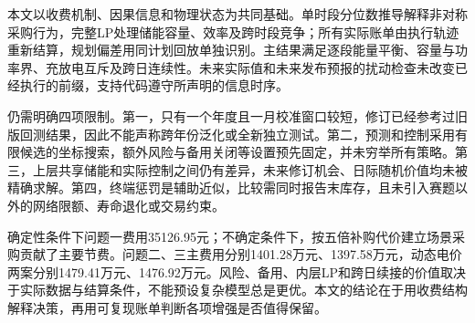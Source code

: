 本文以收费机制、因果信息和物理状态为共同基础。单时段分位数推导解释非对称采购行为，完整LP处理储能容量、效率及跨时段竞争；所有实际账单由执行轨迹重新结算，规划偏差用同计划回放单独识别。主结果满足逐段能量平衡、容量与功率界、充放电互斥及跨日连续性。未来实际值和未来发布预报的扰动检查未改变已经执行的前缀，支持代码遵守所声明的信息时序。

仍需明确四项限制。第一，只有一个年度且一月校准窗口较短，修订已经参考过旧版回测结果，因此不能声称跨年份泛化或全新独立测试。第二，预测和控制采用有限候选的坐标搜索，额外风险与备用关闭等设置预先固定，并未穷举所有策略。第三，上层共享储能和实际控制之间仍有差异，未来修订机会、日际随机价值均未被精确求解。第四，终端惩罚是辅助近似，比较需同时报告末库存，且未引入赛题以外的网络限额、寿命退化或交易约束。

确定性条件下问题一费用35126.95元；不确定条件下，按五倍补购代价建立场景采购贡献了主要节费。问题二、三主费用分别1401.28万元、1397.58万元，动态电价两案分别1479.41万元、1476.92万元。风险、备用、内层LP和跨日续接的价值取决于实际数据与结算条件，不能预设复杂模型总是更优。本文的结论在于用收费结构解释决策，再用可复现账单判断各项增强是否值得保留。

